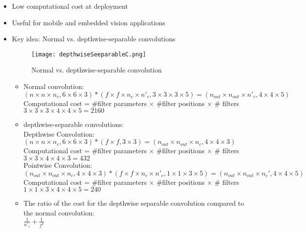\begin{itemize}
\item
    Low computational cost at deployment
\item
    Useful for mobile and embedded vision applications
\item
    Key idea: Normal vs. depthwise-separable convolutions
    \begin{figure}[h]
    \centering
    \texttt{[image: depthwiseSeeparableC.png]}
    \caption{Normal vs. depthwise-separable convolution}
    \label{fig:depthwiseSeeparableC}
    \end{figure}

    \begin{itemize}
    \item
    Normal convolution:\\
    $(n \times n \times n_c, 6\times 6 \times 3) * (f \times f \times n_c \times n'_c, 3 \times 3 \times 3 \times 5) = (n_{out} \times n_{out} \times n'_c, 4 \times 4 \times 5)$\\
    Computational cost = \#filter parameters $\times$  \#filter positions $\times$ \# filters\\
    $3 \times 3 \times 3 \times 4 \times 4 \times 5 = 2160$
    \item
    depthwise-separable convolutions:\\
    Depthwise Convolution:\\
    $(n \times n \times n_c, 6\times 6 \times 3) * (f \times f, 3 \times 3) = (n_{out} \times n_{out} \times n_c, 4 \times 4 \times 3)$\\
    Computational cost = \#filter parameters $\times$  \#filter positions $\times$ \# filters\\
    $3 \times 3 \times 4 \times 4 \times 3 = 432$\\
    Pointwise Convolution:\\
    $(n_{out} \times n_{out} \times n_c, 4\times 4 \times 3) * (f \times f \times n_c \times n'_c, 1 \times 1 \times 3 \times 5) = (n_{out} \times n_{out} \times n_c', 4 \times 4 \times 5)$\\
    Computational cost = \#filter parameters $\times$  \#filter positions $\times$ \# filters\\
    $1 \times 1 \times 3 \times 4 \times 4 \times 5 = 240$\\
    \item
    The ratio of the cost for the depthwise separable convolution compared to the normal convolution:\\
    $\frac{1}{n'_c} + \frac{1}{f^2}$
    \end{itemize}
\end{itemize}


